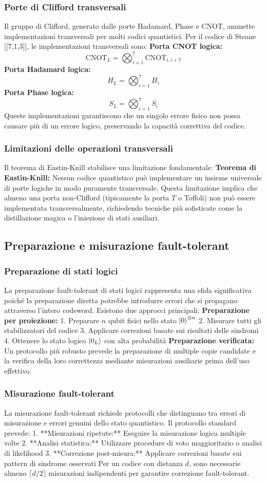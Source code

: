 \documentclass[a4paper,12pt]{report}
\theoremstyle{plain}
\begin{document}
\subsubsection{Porte di Clifford transversali}
Il gruppo di Clifford, generato dalle porte Hadamard, Phase e CNOT, ammette implementazioni transversali per molti codici quantistici. Per il codice di Steane [[7,1,3]], le implementazioni transversali sono:
\textbf{Porta CNOT logica:}
\[
\text{CNOT}_L = \bigotimes_{i=1}^{7} \text{CNOT}_{i,i+7}
\]
\textbf{Porta Hadamard logica:}
\[
H_L = \bigotimes_{i=1}^{7} H_i
\]
\textbf{Porta Phase logica:}
\[
S_L = \bigotimes_{i=1}^{7} S_i
\]
Queste implementazioni garantiscono che un singolo errore fisico non possa causare più di un errore logico, preservando la capacità correttiva del codice.
\subsubsection{Limitazioni delle operazioni transversali}
Il teorema di Eastin-Knill stabilisce una limitazione fondamentale:
\textbf{Teorema di Eastin-Knill:} Nessun codice quantistico può implementare un insieme universale di porte logiche in modo puramente transversale.
Questa limitazione implica che almeno una porta non-Clifford (tipicamente la porta $T$ o Toffoli) non può essere implementata transversalmente, richiedendo tecniche più sofisticate come la distillazione magica o l'iniezione di stati ausiliari.
\subsection{Preparazione e misurazione fault-tolerant}
\subsubsection{Preparazione di stati logici}
La preparazione fault-tolerant di stati logici rappresenta una sfida significativa poiché la preparazione diretta potrebbe introdurre errori che si propagano attraverso l'intero codeword. Esistono due approcci principali:
\textbf{Preparazione per proiezione:}
1. Preparare $n$ qubit fisici nello stato $\ket{0}^{\otimes n}$
2. Misurare tutti gli stabilizzatori del codice
3. Applicare correzioni basate sui risultati delle sindromi
4. Ottenere lo stato logico $\ket{0_L}$ con alta probabilità
\textbf{Preparazione verificata:}
Un protocollo più robusto prevede la preparazione di multiple copie candidate e la verifica della loro correttezza mediante misurazioni ausiliarie prima dell'uso effettivo.
\subsubsection{Misurazione fault-tolerant}
La misurazione fault-tolerant richiede protocolli che distinguano tra errori di misurazione e errori genuini dello stato quantistico. Il protocollo standard prevede:
1. **Misurazioni ripetute:** Eseguire la misurazione logica multiple volte
2. **Analisi statistica:** Utilizzare procedure di voto maggioritario o analisi di likelihood
3. **Correzione post-misura:** Applicare correzioni basate sui pattern di sindrome osservati
Per un codice con distanza $d$, sono necessarie almeno $\lceil d/2 \rceil$ misurazioni indipendenti per garantire correzione fault-tolerant.
\end{document}

